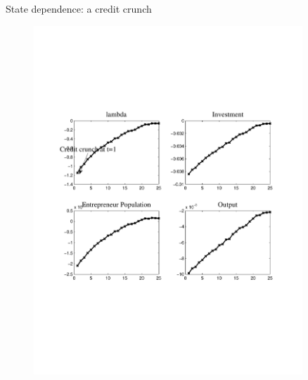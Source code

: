 \documentclass[svgnames]{beamer}
\begin{document}
\begin{frame}{State dependence: a credit crunch}
\begin{figure}[!ht]
\includegraphics[trim=1cm 6.5cm 1cm 6.5cm, clip=true, width=0.9\textwidth]{graph/LambdaShockRes.pdf}
\end{figure}
\end{frame}
\end{document}

